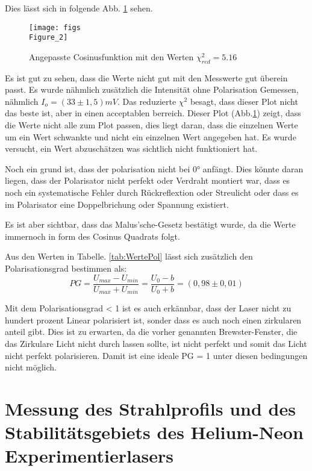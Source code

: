 Dies lässt sich in folgende Abb. \ref{fig:PolarisationFigur} sehen.

\begin{figure}
    \centering
    \texttt{[image: figs\\Figure\_2]}
    \caption{Angepasste Cosinusfunktion mit den Werten $\chi^2_{red} = 5.16$}
    \label{fig:PolarisationFigur}
\end{figure}

Es ist gut zu sehen, dass die Werte nicht gut mit den Messwerte gut überein passt. 
Es wurde nähmlich zusätzlich die Intensität ohne Polarisation Gemessen, nähmlich $I_o = (33 \pm 1,5) mV$.
Das reduzierte $\chi^2$ besagt, dass dieser Plot nicht das beste ist, aber in einen acceptablen berreich. 
Dieser Plot (Abb.\ref{fig:PolarisationFigur}) zeigt, dass die Werte nicht alle zum Plot passen, dies liegt daran, dass die einzelnen Werte um ein Wert schwankte und nicht ein einzelnen Wert angegeben hat. 
Es wurde versucht, ein Wert abzuschätzen was sichtlich nicht funktioniert hat. 

Noch ein grund ist, dass der polarisation nicht bei $0°$ anfängt.
Dies könnte daran liegen, dass der Polarisator nicht perfekt oder Verdraht montiert war, dass es noch ein systematische Fehler durch Rückreflextion oder Streulicht oder dass es im Polarisator eine Doppelbrichung oder Spannung existiert.


Es ist aber sichtbar, dass das Malus'sche-Gesetz bestätigt wurde, da die Werte immernoch in form des Cosinus Quadrats folgt. 

Aus den Werten in Tabelle. \ref{tab:WertePol} lässt sich zusätzlich den Polarisationsgrad bestimmen als:
\begin{equation*}
    PG = \frac{U_{max}-U_{min}}{U_{max}+U_{min}} = \frac{U_0-b}{U_0 + b} = (0,98 \pm 0,01) 
\end{equation*}

Mit dem Polarisationsgrad < 1 ist es auch erkännbar, dass der Laser nicht zu hundert prozent Linear polarisiert ist, sonder dass es auch noch einen zirkularen anteil gibt.
Dies ist zu erwarten, da die vorher genannten Brewster-Fenster, die das Zirkulare Licht nicht durch lassen sollte, ist nicht perfekt und somit das Licht nicht perfekt polarisieren.
Damit ist eine ideale PG = 1 unter diesen bedingungen nicht möglich.


\chapter{Messung des Strahlprofils und des Stabilitätsgebiets des
Helium-Neon Experimentierlasers}







